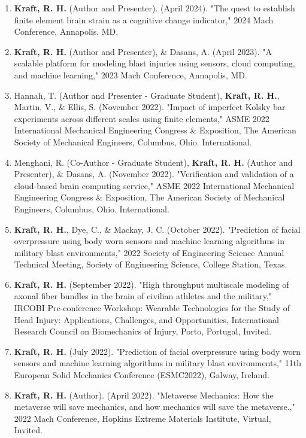 \documentclass[a4paper,10pt]{article}
\begin{document}
\begin{enumerate}
\def\labelenumi{\arabic{enumi}.}
  \item \textbf{\textbf{Kraft,} R. H.} (Author and Presenter). (April 2024). "The quest to establish finite element brain strain as a cognitive change indicator," 2024 Mach Conference, Annapolis, MD.
  \item \textbf{\textbf{Kraft,} R. H.} (Author and Presenter), \&
 Dasans, A. (April 2023). "A scalable platform for modeling blast injuries using sensors, cloud computing, and machine learning," 2023 Mach Conference, Annapolis, MD.
  \item Hannah, T. (Author and Presenter - Graduate Student), \textbf{\textbf{Kraft,} R. H.}, Martin, V., \&
 Ellis, S. (November 2022). "Impact of imperfect Kolsky bar experiments across different scales using finite elements," ASME 2022 International Mechanical Engineering Congress \&
 Exposition, The American Society of Mechanical Engineers, Columbus, Ohio. International.
  \item Menghani, R. (Co-Author - Graduate Student), \textbf{\textbf{Kraft,} R. H.} (Author and Presenter), \&
 Dasans, A. (November 2022). "Verification and validation of a cloud-based brain computing service," ASME 2022 International Mechanical Engineering Congress \&
 Exposition, The American Society of Mechanical Engineers, Columbus, Ohio. International.
  \item \textbf{\textbf{Kraft,} R. H.}, Dye, C., \&
 Mackay, J. C. (October 2022). "Prediction of facial overpressure using body worn sensors and machine learning algorithms in military blast environments," 2022 Society of Engineering Science Annual Technical Meeting, Society of Engineering Science, College Station, Texas.
  \item \textbf{\textbf{Kraft,} R. H.} (September 2022). "High throughput multiscale modeling of axonal fiber bundles in the brain of civilian athletes and the military," IRCOBI Pre-conference Workshop: Wearable Technologies for the Study of Head Injury: Applications, Challenges, and Opportunities, International Research Council on Biomechanics of Injury, Porto, Portugal, Invited.
  \item \textbf{\textbf{Kraft,} R. H.} (July 2022). "Prediction of facial overpressure using body worn sensors and machine learning algorithms in military blast environments," 11th European Solid Mechanics Conference (ESMC2022), Galway, Ireland.
  \item \textbf{\textbf{Kraft,} R. H.} (Author). (April 2022). "Metaverse Mechanics: How the metaverse will save mechanics, and how mechanics will save the metaverse.," 2022 Mach Conference, Hopkins Extreme Materials Institute, Virtual, Invited.

\end{enumerate}
\end{document}
